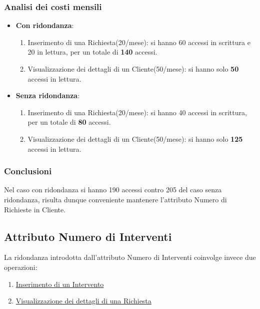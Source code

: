 \documentclass{article}
\begin{document}
\subsubsection{Analisi dei costi mensili}

\begin{itemize}
    \item \textbf{Con ridondanza}:
    \begin{enumerate}
        \item Inserimento di una Richiesta(20/mese): si hanno 60 accessi in scrittura e 20 in lettura, per un totale di \textbf{140} accessi.
        \item Visualizzazione dei dettagli di un Cliente(50/mese): si hanno solo \textbf{50} accessi in lettura.
    \end{enumerate}
    \item \textbf{Senza ridondanza}:
    \begin{enumerate}
        \item Inserimento di una Richiesta(20/mese): si hanno 40 accessi in scrittura, per un totale di \textbf{80} accessi.
        \item Visualizzazione dei dettagli di un Cliente(50/mese): si hanno solo \textbf{125} accessi in lettura.
    \end{enumerate}
\end{itemize}

\subsubsection{Conclusioni}

Nel caso con ridondanza si hanno 190 accessi contro 205 del caso senza ridondanza, risulta dunque conveniente mantenere l'attributo Numero di Richieste in Cliente.

\newpage

\subsection{Attributo Numero di Interventi}

La ridondanza introdotta dall'attributo Numero di Interventi coinvolge invece due operazioni:
\begin{enumerate}
    \item \underline{Inserimento di un Intervento}
    \item \underline{Visualizzazione dei dettagli di una Richiesta}
\end{enumerate}
\end{document}
